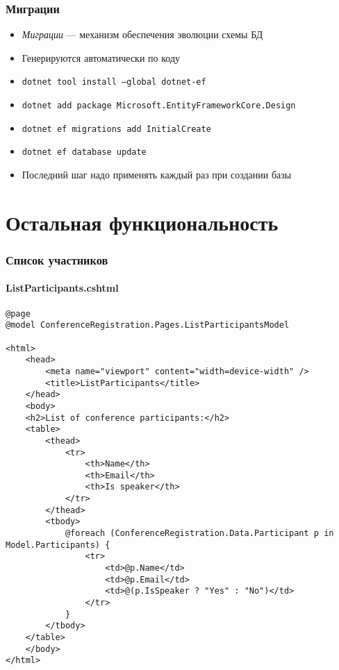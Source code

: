 \documentclass{../../slides-style}
\begin{document}
    \begin{frame}[fragile]
        \frametitle{Миграции}
        \begin{itemize}
            \item \emph{Миграции} --- механизм обеспечения эволюции схемы БД
            \item Генерируются автоматически по коду
            \item \texttt{dotnet tool install --global dotnet-ef}
            \item \texttt{dotnet add package Microsoft.EntityFrameworkCore.Design}
            \item \texttt{dotnet ef migrations add InitialCreate}
            \item \texttt{dotnet ef database update}
            \item Последний шаг надо применять каждый раз при создании базы
        \end{itemize}
    \end{frame}

    \section{Остальная функциональность}

    \begin{frame}[fragile]
        \frametitle{Список участников}
        \framesubtitle{ListParticipants.cshtml}
        \begin{ssmall}
            \begin{verbatim}
@page
@model ConferenceRegistration.Pages.ListParticipantsModel

<html>
    <head>
        <meta name="viewport" content="width=device-width" />
        <title>ListParticipants</title>
    </head>
    <body>
    <h2>List of conference participants:</h2>
    <table>
        <thead>
            <tr>
                <th>Name</th>
                <th>Email</th>
                <th>Is speaker</th>
            </tr>
        </thead>
        <tbody>
            @foreach (ConferenceRegistration.Data.Participant p in Model.Participants) {
                <tr>
                    <td>@p.Name</td>
                    <td>@p.Email</td>
                    <td>@(p.IsSpeaker ? "Yes" : "No")</td>
                </tr>
            }
        </tbody>
    </table>
    </body>
</html>
            \end{verbatim}
        \end{ssmall}
    \end{frame}
\end{document}
